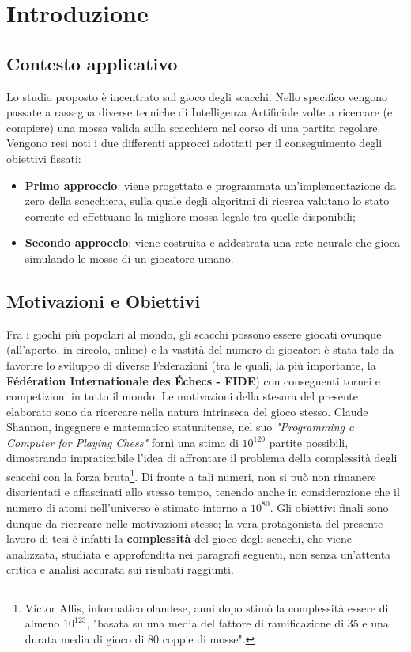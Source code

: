\chapter{Introduzione}
\label{cap: introduzione}
\section{Contesto applicativo}
\label{cap: contesto_applicativo}
Lo studio proposto è incentrato sul gioco degli scacchi. Nello specifico vengono passate a rassegna diverse tecniche di 
Intelligenza Artificiale volte a ricercare (e compiere) una mossa valida sulla scacchiera nel corso di una partita regolare.
Vengono resi noti i due differenti approcci adottati per il conseguimento degli obiettivi fissati: 
\begin{itemize}
    \item \textbf{Primo approccio}: viene progettata e programmata un'implementazione da zero della scacchiera, sulla quale degli algoritmi di ricerca valutano lo stato corrente ed effettuano la migliore mossa legale tra quelle disponibili;
    \item \textbf{Secondo approccio}: viene costruita e addestrata una rete neurale che gioca simulando le mosse di un giocatore umano. 
\end{itemize}

\section{Motivazioni e Obiettivi} %
Fra i giochi più popolari al mondo, gli scacchi possono essere giocati ovunque (all'aperto, in circolo, online) e la vastità del numero di 
giocatori è stata tale da favorire lo sviluppo di diverse Federazioni (tra le quali, la più importante, la 
\textbf{Fédération Internationale des Échecs - FIDE}) con conseguenti tornei e competizioni in tutto il mondo. 
Le motivazioni della stesura del presente elaborato sono da ricercare nella natura intrinseca del gioco stesso. 
Claude Shannon, ingegnere e matematico statunitense, nel suo \textit{"Programming a Computer for Playing Chess"} fornì una stima di $10^{120}$
partite possibili, dimostrando impraticabile l'idea di affrontare il problema della complessità degli scacchi con la forza bruta\footnote{Victor Allis, informatico olandese, 
anni dopo stimò la complessità essere di almeno $10^{123}$, "basata su una media del fattore di ramificazione di 35 e una 
durata media di gioco di 80 coppie di mosse".}. Di fronte a tali numeri, non si può non rimanere disorientati e affascinati allo
stesso tempo, tenendo anche in considerazione che il numero di atomi nell'universo è stimato intorno a $10^{80}$. 
Gli obiettivi finali sono dunque da ricercare nelle motivazioni stesse; la vera protagonista del
presente lavoro di tesi è infatti la \textbf{complessità} del gioco degli scacchi, che viene analizzata, studiata e approfondita nei paragrafi
seguenti, non senza un'attenta critica e analisi accurata sui risultati raggiunti.

